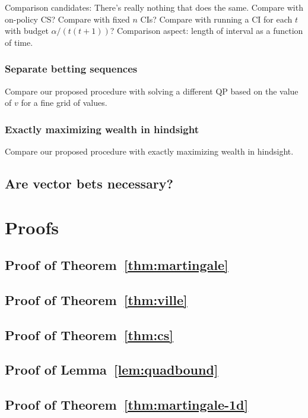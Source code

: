 Comparison candidates: There's really nothing that does 
the same. Compare with on-policy CS? 
Compare with fixed $n$ CIs?
Compare with running a CI for each $t$ with budget 
$\alpha/(t(t+1))$?
Comparison aspect: length of interval as a function of time.
\subsubsection{Separate betting sequences}
Compare our proposed procedure with solving a different QP based on 
the value of $v$ for a fine grid of values.
\subsubsection{Exactly maximizing wealth in hindsight}
Compare our proposed procedure with exactly maximizing wealth in hindsight.
\subsection{Are vector bets necessary?}



\newpage
\onecolumn
\appendix
\section{Proofs}

\subsection{Proof of Theorem~\ref{thm:martingale}}
\subsection{Proof of Theorem~\ref{thm:ville}}
\subsection{Proof of Theorem~\ref{thm:cs}}
\subsection{Proof of Lemma~\ref{lem:quadbound}}
\subsection{Proof of Theorem~\ref{thm:martingale-1d}}
